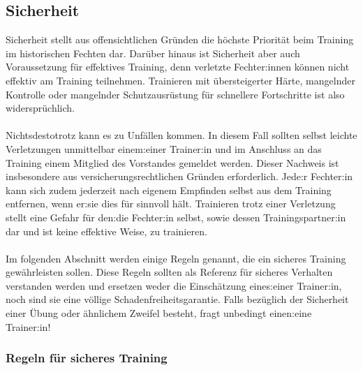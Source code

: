 \newpage

\subsection{Sicherheit}

Sicherheit stellt aus offensichtlichen Gründen die höchste Priorität beim Training im historischen Fechten dar.
Darüber hinaus ist Sicherheit aber auch Voraussetzung für effektives Training, denn verletzte Fechter:innen können nicht effektiv am Training teilnehmen.
Trainieren mit übersteigerter Härte, mangelnder Kontrolle oder mangelnder Schutzausrüstung für schnellere Fortschritte ist also widersprüchlich.
\\
\\
Nichtsdestotrotz kann es zu Unfällen kommen.
In diesem Fall sollten selbst leichte Verletzungen unmittelbar einem:einer Trainer:in und im Anschluss an das Training einem Mitglied des Vorstandes gemeldet werden.
Dieser Nachweis ist insbesondere aus versicherungsrechtlichen Gründen erforderlich.
Jede:r Fechter:in kann sich zudem jederzeit nach eigenem Empfinden selbst aus dem Training entfernen, wenn er:sie dies für sinnvoll hält.
Trainieren trotz einer Verletzung stellt eine Gefahr für den:die Fechter:in selbst, sowie dessen Trainingspartner:in dar und ist keine effektive Weise, zu trainieren.
\\
\\
Im folgenden Abschnitt werden einige Regeln genannt, die ein sicheres Training gewährleisten sollen.
Diese Regeln sollten als Referenz für sicheres Verhalten verstanden werden und ersetzen weder die Einschätzung eines:einer Trainer:in, noch sind sie eine völlige Schadenfreiheitsgarantie.
Falls bezüglich der Sicherheit einer Übung oder ähnlichem Zweifel besteht, fragt unbedingt einen:eine Trainer:in!

\subsubsection{Regeln für sicheres Training}

